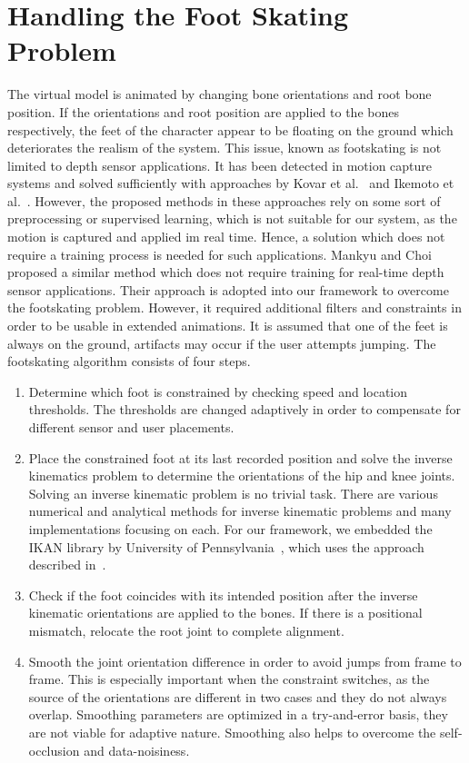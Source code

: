 \section{Handling the Foot Skating Problem}
\label{section_foot_skating}
The virtual model is animated by changing bone orientations and root bone position. If the orientations and root position are applied to the bones respectively, the feet of the character appear to be floating on the ground which deteriorates the realism of the system. 
This issue, known as footskating is not limited to depth sensor applications. It has been detected in motion capture systems and solved sufficiently with approaches by Kovar et al.~\cite{Kovar2002} and Ikemoto et al.~\cite{Ikemoto2006}. However, the proposed methods in these approaches rely on some sort of preprocessing or supervised learning, which is not suitable for our system, as the motion is captured and applied im real time. Hence, a solution which does not require a training process is needed for such applications. Mankyu and Choi~\cite{Mankyu2013} proposed a similar method which does not require training for real-time depth sensor applications. Their approach is adopted into our framework to overcome the footskating problem. However, it required additional filters and constraints in order to be usable in extended animations. It is assumed that one of the feet is always on the ground, artifacts may occur if the user attempts jumping. The footskating algorithm consists of four steps. 

\begin{enumerate}
\item Determine which foot is constrained by checking speed and location thresholds. The thresholds are changed adaptively in order to compensate for different sensor and user placements.

\item Place the constrained foot at its last recorded position and solve the inverse kinematics problem to determine the orientations of the hip and knee joints. Solving an inverse kinematic problem is no trivial task. There are various numerical and analytical methods for inverse kinematic problems and many implementations focusing on each. For our framework, we embedded the IKAN library by University of Pennsylvania~\cite{IKAN2013}, which uses the approach described in~\cite{Tolani2000}.  

\item Check if the foot coincides with its intended position after the inverse kinematic orientations are applied to the bones. If there is a positional mismatch, relocate the root joint to complete alignment.

\item Smooth the joint orientation difference in order to avoid jumps from frame to frame. This is especially important when the constraint switches, as the source of the orientations are different in two cases and they do not always overlap. Smoothing parameters are optimized in a try-and-error basis, they are not viable for adaptive nature. Smoothing also helps to overcome the self-occlusion and data-noisiness.
\end{enumerate}


